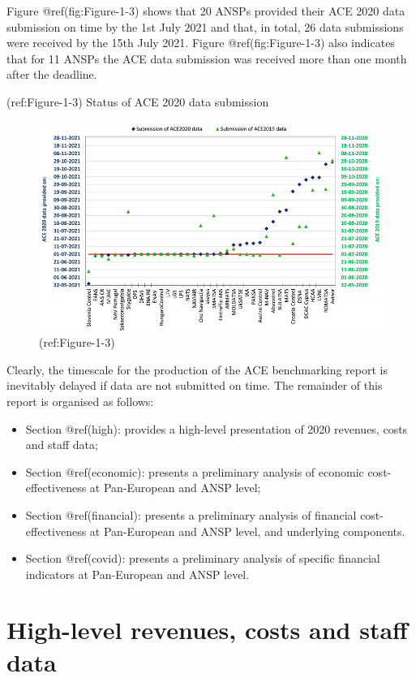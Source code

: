 \documentclass[
]{book}
\providecommand{\tightlist}{%
  \setlength{\itemsep}{0pt}\setlength{\parskip}{0pt}}
\begin{document}
Figure @ref(fig:Figure-1-3) shows that 20 ANSPs provided their ACE 2020
data submission on time by the 1st July 2021 and that, in total, 26 data
submissions were received by the 15th July 2021. Figure
@ref(fig:Figure-1-3) also indicates that for 11 ANSPs the ACE data
submission was received more than one month after the deadline.

(ref:Figure-1-3) Status of ACE 2020 data submission

\begin{figure}

{\centering \includegraphics[width=0.8\linewidth]{figures/Figure-1-3} 

}

\caption{(ref:Figure-1-3)}\label{fig:Figure-1-3}
\end{figure}

Clearly, the timescale for the production of the ACE benchmarking report
is inevitably delayed if data are not submitted on time. The remainder
of this report is organised as follows:

\begin{itemize}
\tightlist
\item
  Section @ref(high): provides a high-level presentation of 2020
  revenues, costs and staff data;
\item
  Section @ref(economic): presents a preliminary analysis of economic
  cost-effectiveness at Pan-European and ANSP level;
\item
  Section @ref(financial): presents a preliminary analysis of financial
  cost-effectiveness at Pan-European and ANSP level, and underlying
  components.
\item
  Section @ref(covid): presents a preliminary analysis of specific
  financial indicators at Pan-European and ANSP level.
\end{itemize}

\hypertarget{high}{%
\chapter{High-level revenues, costs and staff data}\label{high}}
\end{document}
